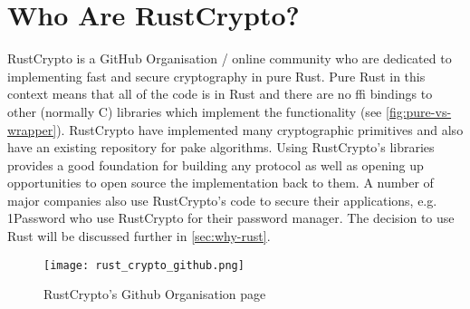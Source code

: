 \clearpage
\section{Who Are RustCrypto?}
\label{sec:whom-rustcrypto}

RustCrypto is a GitHub Organisation / online community who are dedicated to implementing fast and secure cryptography in pure Rust.
Pure Rust in this context means that all of the code is in Rust and there are no \gls{ffi} bindings to other (normally C) libraries which implement the functionality (see \cref{fig:pure-vs-wrapper}).
RustCrypto have implemented many cryptographic primitives and also have an existing repository for \gls{pake} algorithms.
Using RustCrypto's libraries provides a good foundation for building any protocol as well as opening up opportunities to open source the implementation back to them.
A number of major companies also use RustCrypto's code to secure their applications, e.g. 1Password who use RustCrypto for their password manager.
The decision to use Rust will be discussed further in \cref{sec:why-rust}.

\begin{figure}[H]
  \centering
  \texttt{[image: rust\_crypto\_github.png]}
  \caption{RustCrypto's Github Organisation page}
  \label{fig:rc-github}
\end{figure}

